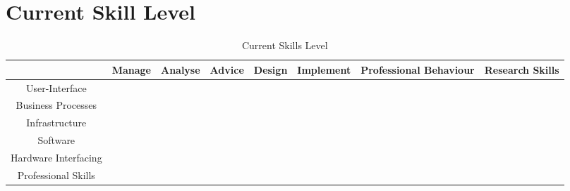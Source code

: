 
\section{Current Skill Level}
\label{sec:current}

\begin{table}[H]
	\centering
	\begin{tabular}{|c|c|c|c|c|c|c|c|}
		\hline
		& Manage & Analyse & Advice & Design & Implement & Professional Behaviour & Research Skills \\ \hline
		User-Interface & & & & & & & \\ \hline
		Business Processes & & & & & & & \\ \hline
		Infrastructure &  &  & &  &  & & \\ \hline
		Software &  &  &  &  &  & & \\ \hline
		Hardware Interfacing & & & & & & & \\ \hline
		Professional Skills & & & & & &  &  \\ \hline
	\end{tabular}
	\caption{Current Skills Level}
	\label{currentskills}
\end{table}